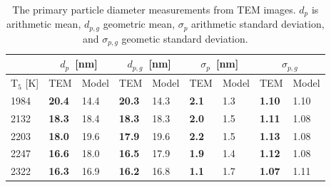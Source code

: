 \renewcommand{\arraystretch}{1.2}
\begin{table}[!t]
	\centering
	\caption{The primary particle diameter measurements from TEM images. $d_{p}$ is arithmetic mean, $d_{p,g}$ geometric mean, $\sigma_{p}$ arithmetic standard deviation, and $\sigma_{p,g}$ geometic standard deviation.}
	\label{tab:dp_tem_variousT5}
	\begin{tabular}{l|ll|ll|ll|ll}
		\hline
		\multicolumn{1}{c}{} & \multicolumn{2}{c}{$d_{p}$~[nm]} & \multicolumn{2}{c}{$d_{p,g}$~[nm]} & \multicolumn{2}{c}{$\sigma_{p}$~[nm]} & \multicolumn{2}{c}{$\sigma_{p,g}$} \\ \hline
		T$_5$ {[}K{]} & TEM                   & Model        & TEM               & Model     & TEM                & Model       & TEM                  & Model       \\ \hline
		1984          & \textbf{20.4}         & 14.4         & \textbf{20.3}     & 14.3      & \textbf{2.1}       & 1.3         & \textbf{1.10}        & 1.10        \\ \hline
		2132          & \textbf{18.3}         & 18.4         & \textbf{18.3}     & 18.3      & \textbf{2.0}       & 1.5         & \textbf{1.11}        & 1.08        \\ \hline
		2203          & \textbf{18.0}         & 19.6         & \textbf{17.9}     & 19.6      & \textbf{2.2}       & 1.5         & \textbf{1.13}        & 1.08        \\ \hline
		2247          & \textbf{16.6}         & 18.0         & \textbf{16.5}     & 17.9      & \textbf{1.9}       & 1.4         & \textbf{1.12}        & 1.08        \\ \hline
		2322          & \textbf{16.3}         & 16.9         & \textbf{16.2}     & 16.8      & \textbf{1.1}       & 1.7         & \textbf{1.07}        & 1.11       \\ \hline
	\end{tabular}
\end{table}
